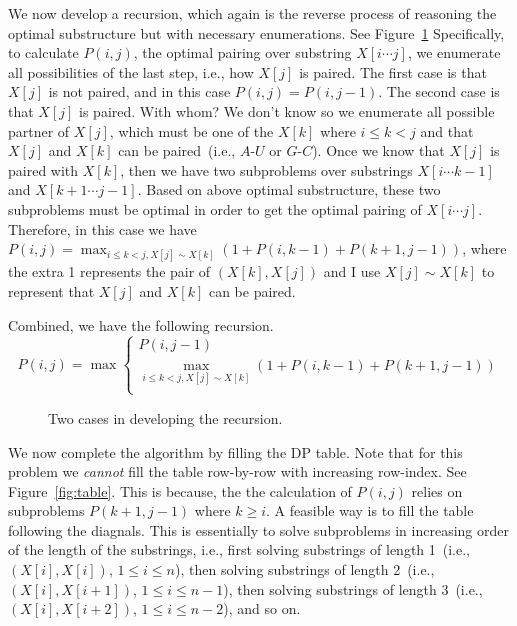 \documentclass[letterpaper,11pt]{article}
\theoremstyle{mytheorem}
\begin{document}
We now develop a recursion, which again is the reverse process of reasoning the optimal substructure
but with necessary enumerations.
See Figure~\ref{fig:recursion}
Specifically, to calculate $P(i,j)$, the optimal pairing over substring $X[i\cdots j]$,
we enumerate all possibilities of the last step, i.e., how $X[j]$ is paired.
The first case is that $X[j]$ is not paired, and in this case $P(i,j) = P(i, j-1)$.
The second case is that $X[j]$ is paired. With whom? We don't know so we enumerate
all possible partner of $X[j]$, which must be one of the $X[k]$ where $i \le k < j$
and that $X[j]$ and $X[k]$ can be paired~(i.e., $A$-$U$ or $G$-$C$).
Once we know that $X[j]$ is paired with $X[k]$, then we have two subproblems
over substrings $X[i\cdots k-1]$ and $X[k + 1 \cdots j - 1]$. Based on above optimal substructure,
these two subproblems must be optimal in order to get the optimal pairing of $X[i\cdots j]$.
Therefore, in this case we have $P(i,j) = \max_{i \le k < j, X[j]\sim X[k] } (1 + P(i, k-1) + P(k+1,j-1))$, where
the extra 1 represents the pair of $(X[k], X[j])$ and I use $X[j]\sim X[k]$ to represent that $X[j]$ and $X[k]$ can be paired.

Combined, we have the following recursion.
\begin{displaymath}
P(i,j) = \max\left\{
	\begin{array}{llll}
	P(i,j-1)\\
	\textstyle \max_{i \le k < j, X[j]\sim X[k]} (1 + P(i,k-1) + P(k+1,j-1)) \\
	\end{array}
\right.
\end{displaymath}

\begin{figure}[h]
\centering{}
\caption{Two cases in developing the recursion.}
\label{fig:recursion}
\end{figure}


We now complete the algorithm by filling the DP table.
Note that for this problem we \emph{cannot} fill the table row-by-row with increasing row-index.
See Figure~\ref{fig:table}.
This is because, the the calculation of $P(i,j)$ relies on subproblems $P(k + 1, j - 1)$ where $k \ge i$.
A feasible way is to fill the table following the diagnals.
This is essentially to solve subproblems in increasing order of the length of the substrings, i.e.,
first solving substrings of length 1~(i.e., $(X[i], X[i])$, $1\le i \le n$), 
then solving substrings of length 2~(i.e., $(X[i], X[i + 1])$, $1\le i \le n - 1$), 
then solving substrings of length 3~(i.e., $(X[i], X[i + 2])$, $1\le i \le n - 2$),
and so on. 
\end{document}

